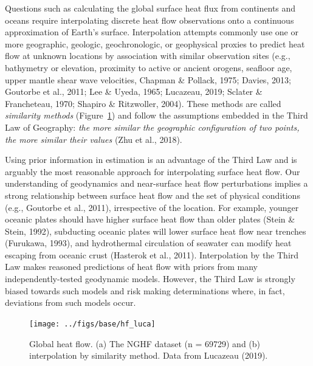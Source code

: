 \documentclass[draft,linenumbers]{agujournal2018}
\begin{document}
Questions such as calculating the global surface heat flux from
continents and oceans require interpolating discrete heat flow
observations onto a continuous approximation of Earth's surface.
Interpolation attempts commonly use one or more geographic, geologic,
geochronologic, or geophysical proxies to predict heat flow at unknown
locations by association with similar observation sites (e.g.,
bathymetry or elevation, proximity to active or ancient orogens,
seafloor age, upper mantle shear wave velocities, Chapman \& Pollack,
1975; Davies, 2013; Goutorbe et al., 2011; Lee \& Uyeda, 1965; Lucazeau,
2019; Sclater \& Francheteau, 1970; Shapiro \& Ritzwoller, 2004). These
methods are called \emph{similarity methods} (Figure~\ref{fig:lucahf})
and follow the assumptions embedded in the Third Law of Geography:
\emph{the more similar the geographic configuration of two points, the
more similar their values} (Zhu et al., 2018).

Using prior information in estimation is an advantage of the Third Law
and is arguably the most reasonable approach for interpolating surface
heat flow. Our understanding of geodynamics and near-surface heat flow
perturbations implies a strong relationship between surface heat flow
and the set of physical conditions (e.g., Goutorbe et al., 2011),
irrespective of the location. For example, younger oceanic plates should
have higher surface heat flow than older plates (Stein \& Stein, 1992),
subducting oceanic plates will lower surface heat flow near trenches
(Furukawa, 1993), and hydrothermal circulation of seawater can modify
heat escaping from oceanic crust (Hasterok et al., 2011). Interpolation
by the Third Law makes reasoned predictions of heat flow with priors
from many independently-tested geodynamic models. However, the Third Law
is strongly biased towards such models and risk making determinations
where, in fact, deviations from such models occur.

\begin{figure}[h]

{\centering \texttt{[image: ../figs/base/hf\_luca]} 

}

\caption{Global heat flow. (a) The NGHF dataset (n = 69729) and (b) interpolation by similarity method. Data from Lucazeau (2019).}\label{fig:lucahf}
\end{figure}
\end{document}
